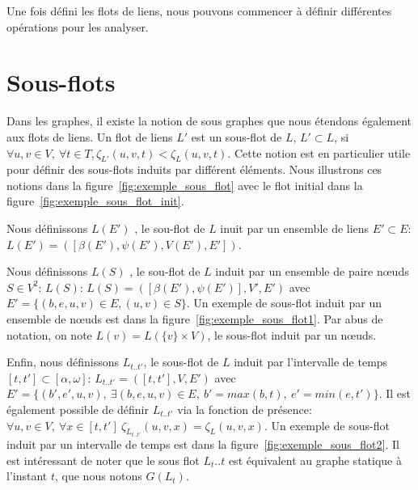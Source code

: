 Une fois défini les flots de liens, nous pouvons commencer à définir différentes opérations pour les analyser.


\section{Sous-flots}
Dans les graphes, il existe la notion de sous graphes que nous étendons également aux flots de liens.
Un flot de liens $L'$ est un sous-flot de $L$, $L' \subset L$, si  $\forall u,v \in V,\ \forall t\in T, \zeta_{L'}(u,v,t) < \zeta_{L}(u,v,t)$.
Cette notion est en particulier utile pour définir des sous-flots induits par différent éléments.
Nous illustrons ces notions dans la figure~\ref{fig:exemple_sous_flot} avec le flot initial dans la figure~\ref{fig:exemple_sous_flot_init}.
 
Nous définissons $L(E')$ , le sou-flot de $L$ inuit par un ensemble de liens $E' \subset E$: $L(E')=([\beta(E'),\psi(E'),V(E'),E'])$.

 
Nous définissons $L(S)$ , le sou-flot de $L$ induit par un ensemble de paire n\oe uds $S \in V^ 2$: $L(S)$: $L(S)=([\beta(E'),\psi(E')],V',E')$ avec $E'= \{(b,e,u,v) \in E, (u,v) \in S\}$.
Un exemple de sous-flot induit par un ensemble de n\oe uds est dans la figure~\ref{fig:exemple_sous_flot1}.
Par abus de notation, on note $L(v)= L(\{v\}\times V)$, le sous-flot induit par un n\oe uds.


Enfin, nous définissons $L_{t..t'}$, le sous-flot de $L$ induit par l'intervalle de temps $[t,t'] \subset [\alpha, \omega]$: $L_{t..t'}=([t, t'], V,E')$ avec $E'= \{(b',e',u,v),\ \exists (b,e,u,v) \in E,\ b'= max(b,t),\ e'=min(e,t')\}$.
Il est également possible de définir $L_{t..t'}$ via la fonction de présence: $\forall u,v \in V,\ \forall x \in [t,t']\  \zeta_{L_{t..t'}}(u,v,x) = \zeta_{L}(u,v,x)$.
Un exemple de sous-flot induit par un intervalle de temps est dans la figure~\ref{fig:exemple_sous_flot2}.
Il est intéressant de noter que le sous flot $L_t..t$ est équivalent au graphe statique à l'instant $t$,  que nous notons $G(L_t)$.


